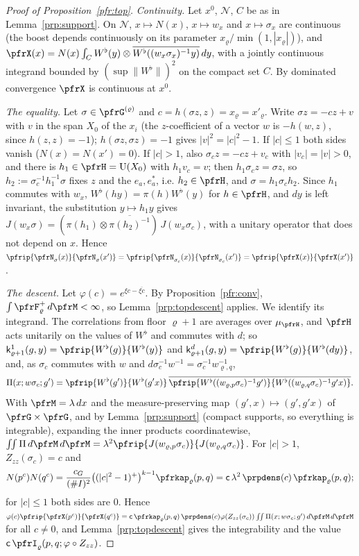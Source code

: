 \documentclass[10pt]{amsart}
\theoremstyle{definition}
\theoremstyle{remark}
\providecommand{\auU}{\mathrm U}
\begin{document}
\begin{proof}[Proof of Proposition~\ref{pfr:top}]
\emph{Continuity.} Let $x^0$, $\mathcal N$, $C$ be as in Lemma~\ref{prp:support}. On $\mathcal N$, $x\mapsto N(x)$,
$x\mapsto w_x$ and $x\mapsto\sigma_x$ are continuous (the boost depends continuously on its parameter
$x_\varrho/\min(1,|x_\varrho|)$), and $\pfrX(x)=N(x)\int_CW^\flat(y)\otimes\overline{W^\flat((w_x\sigma_x)^{-1}y)}\,dy$, with a
jointly continuous integrand bounded by $(\sup\|W^\flat\|)^2$ on the compact set $C$. By dominated convergence $\pfrX$ is
continuous at $x^0$.

\emph{The equality.} Let $\sigma\in\pfrG^{(\varrho)}$ and $c=h(\sigma z,z)=x_\varrho=x'_\varrho$. Write $\sigma z=-cz+v$ with $v$ in the
span $X_0$ of the $x_i$ (the $z$-coefficient of a vector $w$ is $-h(w,z)$, since $h(z,z)=-1$); $h(\sigma z,\sigma z)=-1$ gives $|v|^2=|c|^2-1$. If $|c|\le1$ both sides vanish ($N(x)=N(x')=0$).
If $|c|>1$, also $\sigma_cz=-cz+v_c$ with $|v_c|=|v|>0$, and there is $h_1\in\pfrH=\auU(X_0)$ with $h_1v_c=v$; then
$h_1\sigma_cz=\sigma z$, so $h_2:=\sigma_c^{-1}h_1^{-1}\sigma$ fixes $z$ and the $e_a,e_a^*$, i.e. $h_2\in\pfrH$, and
$\sigma=h_1\sigma_ch_2$. Since $h_1$ commutes with $w_x$, $W^\flat(hy)=\pi(h)W^\flat(y)$ for $h\in\pfrH$, and $dy$ is left
invariant, the substitution $y\mapsto h_1y$ gives $J(w_x\sigma)=(\pi(h_1)\otimes\overline{\pi(h_2)^{-1}})\,J(w_x\sigma_c)$,
with a unitary operator that does not depend on $x$. Hence
$\pfrip{\pfrN_\sigma(x)}{\pfrN_\sigma(x')}=\pfrip{\pfrN_{\sigma_c}(x)}{\pfrN_{\sigma_c}(x')}=\pfrip{\pfrX(x)}{\pfrX(x')}$.

\emph{The descent.} Let $\varphi(c)=e^{\xi c-\overline{\xi c}}$. By Proposition~\ref{pfr:conv},
$\int\pfrF^+_\varrho\,d\pfrM<\infty$, so Lemma~\ref{prp:topdescent} applies. We identify its integrand. The correlations
from floor $\varrho+1$ are averages over $\mu_\pfrH$, and $\pfrH$ acts unitarily on the values of $W^\flat$ and commutes
with $d$; so $\mathsf k^1_{\varrho+1}(g,y)=\pfrip{W^\flat(g)}{W^\flat(y)}$ and $\mathsf k^d_{\varrho+1}(g,y)=
\pfrip{W^\flat(g)}{W^\flat(dy)}$, and, as $\sigma_c$ commutes with $w$ and $d\sigma_c^{-1}w^{-1}=\sigma_c^{-1}w_{\varrho,q}^{-1}$,
\[
\Pi(x;w\sigma_c;g')=\pfrip{W^\flat(g')}{W^\flat(g'x)}\,\overline{\pfrip{W^\flat((w_{\varrho,p}\sigma_c)^{-1}g')}{W^\flat((w_{\varrho,q}
\sigma_c)^{-1}g'x)}}.
\]
With $\pfrM=\lambda\,dx$ and the measure-preserving map $(g',x)\mapsto(g',g'x)$ of $\pfrG\times\pfrG$, and by
Lemma~\ref{prp:support} (compact supports, so everything is integrable), expanding the inner products coordinatewise,
$\iint\Pi\,d\pfrM\,d\pfrM=\lambda^2\pfrip{J(w_{\varrho,p}\sigma_c)}{J(w_{\varrho,q}\sigma_c)}$. For $|c|>1$,
$Z_{zz}(\sigma_c)=c$ and
\[
N(p^c)N(q^c)=\frac{c_G}{(\#I)^2}\bigl((|c|^2-1)^+\bigr)^{k-1}\pfrkap_\varrho(p,q)=\mathsf c\,\lambda^2\,\prpdens(c)\,\pfrkap_\varrho(p,q);
\]
for $|c|\le1$ both sides are $0$. Hence $\varphi(c)\pfrip{\pfrX(p^c)}{\pfrX(q^c)}=\mathsf c\,\pfrkap_\varrho(p,q)\,
\prpdens(c)\varphi(Z_{zz}(\sigma_c))\iint\Pi(x;w\sigma_c;g')\,d\pfrM\,d\pfrM$ for all $c\ne0$, and
Lemma~\ref{prp:topdescent} gives the integrability and the value $\mathsf c\,\pfrI_\varrho(p,q;\varphi\circ Z_{zz})$.
\end{proof}
\end{document}
